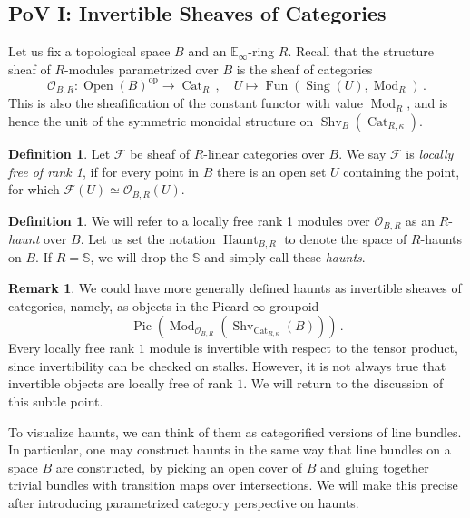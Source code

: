 \documentclass[10pt]{amsart}
\newcommand{\longto}{\longrightarrow}
\theoremstyle{plain}
\theoremstyle{definition}
\newtheorem{definition}[theorem]{Definition}
\newtheorem{rmk}[theorem]{Remark}
\DeclareMathOperator{\Mod}{Mod}
\DeclareMathOperator{\Shv}{Shv}
\DeclareMathOperator{\Sing}{Sing}
\DeclareMathOperator{\Fun}{Fun}
\DeclareMathOperator{\Pic}{Pic}
\DeclareMathOperator{\Haunt}{Haunt}
\DeclareMathOperator{\Open}{Open}
\DeclareMathOperator{\Cat}{Cat}
\newcommand{\oop}{\mathrm{op}}
\newcommand{\bE}{\mathbb{E}}
\newcommand{\bS}{\mathbb{S}}
\newcommand{\cO}{\mathcal{O}}
\begin{document}
\subsection{PoV I: Invertible Sheaves of Categories}

Let us fix a topological space $B$ and an $\bE_\infty$-ring $R$.
Recall that the structure sheaf of $R$-modules parametrized over $B$ is the sheaf of categories
\[
\cO_{B,R} : \Open(B)^{\oop} \longto \Cat_R \,, \quad U \mapsto \Fun(\Sing(U),\Mod_R) \,.
\]
This is also the sheafification of the constant functor with value $\Mod_R$, and is hence the unit of the symmetric monoidal structure on $\Shv_B(\Cat_{R,\kappa})$.

\begin{definition} \label{defn:locallyfreernk1}
Let $\mathcal{F}$ be sheaf of $R$-linear categories over $B$.
We say $\mathcal{F}$ is \emph{locally free of rank 1}, if for every point in $B$ there is an open set $U$ containing the point, for which $\mathcal{F}(U) \simeq \cO_{B, R}(U)$.
\end{definition}

\begin{definition} \label{defn:haunt}
 We will refer to a locally free rank 1 modules over $\cO_{B,R}$ as an $R$-\emph{haunt} over $B$.  Let us set the notation
 $\Haunt_{B,R}$ %
to denote the space of $R$-haunts on $B$.
If $R = \bS$, we will drop the $\bS$ and simply call these \emph{haunts}.
\end{definition}

\begin{rmk}
  We could have more generally defined haunts as invertible sheaves of categories, namely, as objects in the Picard $\infty$-groupoid
  \[
  \Pic\left(\Mod_{\cO_{B,R}}(\Shv_{\mathrm{Cat}_{R, \kappa}}(B))\right) \,.
  \]
  Every locally free rank $1$ module is invertible with respect to the tensor product, since invertibility can be checked on stalks.
  However, it is not always true that invertible objects are locally free of rank $1$.
  We will return to the discussion of this subtle point.
\end{rmk}

To visualize haunts, we can think of them as categorified versions of line bundles.
In particular, one may construct haunts in the same way that line bundles on a space $B$ are constructed, by picking an open cover of $B$ and gluing together trivial bundles with transition maps over intersections.
We will make this precise after introducing parametrized category perspective on haunts.
\end{document}
